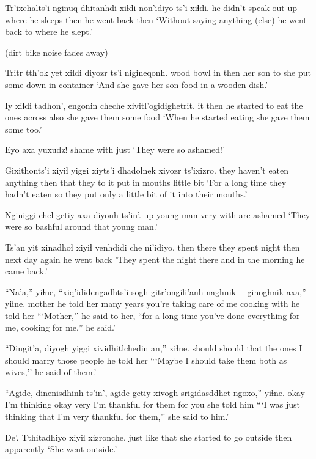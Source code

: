 \documentclass[12pt]{article}
\begin{document}
\gll Tr'ixehalts'i nginuq dhitanhdi xiɬdi non'idiyo ts'i xiɬdi.
{he didn't speak out} up {where he sleeps} then {he went back} {} then
\glt `Without saying anything (else) he went back to where he slept.'
\glend

(dirt bike noise fades away)

\gll Tritr tth'ok yet xiɬdi diyozr ts'i nigineqonh.
wood bowl in then {her son} to {she put some down in container} 
\glt `And she gave her son food in a wooden dish.'
\glend

\gll  Iy xiɬdi tadhon', engonin cheche xivitl'ogidighetrit.
it then {he started to eat} {the ones across} also {she gave them some food}
\glt  `When he started eating she gave them some too.'
\glend

\gll Eyo axa yuxudz!
shame with just
\glt `They were so ashamed!'
\glend

\gll  Gixithonts'i xiyiɬ yiggi xiyts'i dhadolnek xiyozr ts'ixizro.
{they haven't eaten anything} then that {they to it} {put in mouths} {little bit} 
\glt `For a long time they hadn't eaten so they put only a little bit of it into their mouths.'
\glend

\gll Nginiggi chel getiy axa diyonh ts'in'.
up {young man} very  with {are ashamed} {} 
\glt `They were so bashful around that young man.'
\glend

\gll Ts'an yit xinadhoɬ xiyiɬ venhdidi che ni'idiyo.
then there {they spent night} then {next day} again {he went back}
\glt  'They spent the night there and in the morning he came back.'
\glend

\gll ``Na'a,'' yiɬne, ``xiq'ididengadhts'i {sogh gitr'ongili'anh} naghnik--- ginoghnik axa,'' yiɬne.
mother {he told her} {many years} {you're taking care of me} {} cooking with {he told her}
\glt ```Mother,'' he said to her, ``for a long time you've done everything for me, cooking for me,'' he said.'
\glend

\gll ``Dingit'a, diyogh yiggi xividhitlchedin an,'' xiɬne.
should should that {the ones I should marry} {those people} {he told her}
\glt ```Maybe I should take them both as wives,'' he said of them.'
\glend

\gll ``Agide, dinenisdhinh ts'in', agide getiy {xivogh srigidasddhet} ngoxo,'' yiɬne.
okay {I'm thinking} {} okay very {I'm thankful for them} {for you} {she told him}
\glt ```I was just thinking that I'm very thankful for them,'' she said to him.'
\glend

\gll De'. Tthitadhiyo xiyiɬ xizronche. 
{just like that} {she started to go outside} then apparently
\glt `She went outside.'
\glend
\end{document}
